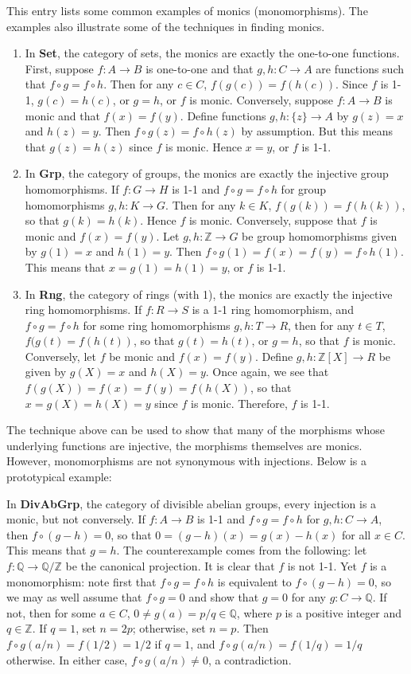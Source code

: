 \documentclass[12pt]{article}
\begin{document}
This entry lists some common examples of monics (monomorphisms).  The examples also illustrate some of the techniques in finding monics.

\begin{enumerate}
\item In \textbf{Set}, the category of sets, the monics are exactly the one-to-one functions.  First, suppose $f:A\to B$ is one-to-one and that $g,h:C\to A$ are functions such that $f\circ g=f\circ h$.  Then for any $c\in C$, $f(g(c))=f(h(c))$.  Since $f$ is 1-1, $g(c)=h(c)$, or $g=h$, or $f$ is monic.  Conversely, suppose $f:A\to B$ is monic and that $f(x)=f(y)$.  Define functions $g,h:\lbrace z\rbrace \to A$ by $g(z)=x$ and $h(z)=y$.  Then $f\circ g(z)=f\circ h(z)$ by assumption.  But this means that $g(z)=h(z)$ since $f$ is monic.  Hence $x=y$, or $f$ is 1-1.
\item In \textbf{Grp}, the category of groups, the monics are exactly the injective group homomorphisms.  If $f:G\to H$ is 1-1 and $f\circ g=f\circ h$ for group homomorphisms $g,h:K\to G$.  Then for any $k\in K$, $f(g(k))=f(h(k))$, so that $g(k)=h(k)$.  Hence $f$ is monic.  Conversely, suppose that $f$ is monic and $f(x)=f(y)$.  Let $g,h:\mathbb{Z}\to G$ be group homomorphisms given by $g(1)=x$ and $h(1)=y$.  Then $f\circ g(1)=f(x)=f(y)=f\circ h(1)$.  This means that $x=g(1)=h(1)=y$, or $f$ is 1-1.
\item In \textbf{Rng}, the category of rings (with 1), the monics are exactly the injective ring homomorphisms.  If $f:R\to S$ is a 1-1 ring homomorphism, and $f\circ g=f\circ h$ for some ring homomorphisms $g,h:T\to R$, then for any $t\in T$, $f(g(t)=f(h(t))$, so that $g(t)=h(t)$, or $g=h$, so that $f$ is monic.  Conversely, let $f$ be monic and $f(x)=f(y)$.  Define $g,h:\mathbb{Z}[X]\to R$ be given by $g(X)=x$ and $h(X)=y$.  Once again, we see that $f(g(X))=f(x)=f(y)=f(h(X))$, so that $x=g(X)=h(X)=y$ since $f$ is monic.  Therefore, $f$ is 1-1.
\end{enumerate}

The technique above can be used to show that many of the morphisms whose underlying functions are injective, the morphisms themselves are monics.  However, monomorphisms are not synonymous with injections.  Below is a prototypical example:

In \textbf{DivAbGrp}, the category of divisible abelian groups, every injection is a monic, but not conversely.  If $f:A\to B$ is 1-1 and $f\circ g=f\circ h$ for $g,h:C\to A$, then $f\circ (g-h)=0$, so that $0=(g-h)(x)=g(x)-h(x)$ for all $x\in C$.  This means that $g=h$.  The counterexample comes from the following: let $f:\mathbb{Q}\to \mathbb{Q}/\mathbb{Z}$ be the canonical projection.  It is clear that $f$ is not 1-1.  Yet $f$ is a monomorphism: note first that $f\circ g=f\circ h$ is equivalent to $f\circ (g-h)=0$, so we may as well assume that $f\circ g=0$ and show that $g=0$ for any $g:C\to \mathbb{Q}$.  If not, then for some $a\in C$, $0\ne g(a)= p/q\in \mathbb{Q}$, where $p$ is a positive integer and $q\in \mathbb{Z}$.  If $q=1$, set $n=2p$; otherwise, set $n=p$.  Then $f\circ g(a/n)=f(1/2)=1/2$ if $q=1$, and $f\circ g(a/n)=f(1/q)=1/q$ otherwise.  In either case, $f\circ g (a/n) \ne 0$, a contradiction.
\end{document}
